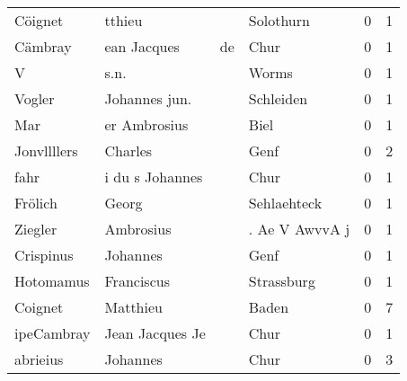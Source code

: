\begin{center}
\begin{tiny}
\begin{longtabu}{llllrr}
                  Cöignet &                             tthieu &             &                                   Solothurn &          0 &         1 \\
                  Cämbray &                        ean Jacques &          de &                                        Chur &          0 &         1 \\
                        V &                               s.n. &             &                                       Worms &          0 &         1 \\
                   Vogler &                      Johannes jun. &             &                                   Schleiden &          0 &         1 \\
                      Mar &                       er Ambrosius &             &                                        Biel &          0 &         1 \\
              Jonvllllers &                            Charles &             &                                        Genf &          0 &         2 \\
                     fahr &                    i du s Johannes &             &                                        Chur &          0 &         1 \\
                  Frölich &                              Georg &             &                                 Sehlaehteck &          0 &         1 \\
                  Ziegler &                          Ambrosius &             &                              . Ae V AwvvA j &          0 &         1 \\
                Crispinus &                           Johannes &             &                                        Genf &          0 &         1 \\
                Hotomamus &                         Franciscus &             &                                  Strassburg &          0 &         1 \\
                  Coignet &                           Matthieu &             &                                       Baden &          0 &         7 \\
               ipeCambray &                    Jean Jacques Je &             &                                        Chur &          0 &         1 \\
                 abrieius &                           Johannes &             &                                        Chur &          0 &         3 \\

\end{longtabu}
\end{tiny}
\end{center}
